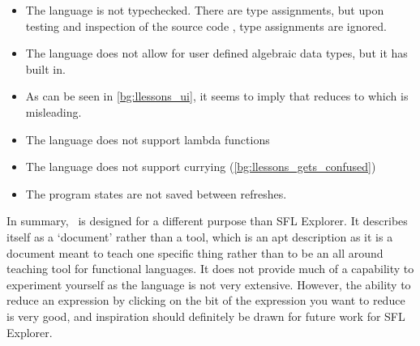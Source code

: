 \begin{itemize}
    \item The language is not typechecked. There are type assignments, but upon testing and inspection of the source code \cite{lambdalessonsgithub}, type assignments are ignored. 
    \item The language does not allow for user defined algebraic data types, but it has  built in. 
    \item As can be seen in \ref{bg:llessons_ui}, it seems to imply that  reduces to \sflinline{[x, y]} which is misleading. 
    \item The language does not support lambda functions
    \item The language does not support currying (\ref{bg:llessons_gets_confused})
    \item The program states are not saved between refreshes.
\end{itemize} 

In summary, \llessons\ is designed for a different purpose than SFL Explorer. It describes itself as a `document' \cite{lambdalessons} rather than a tool, which is an apt description as it is a document meant to teach one specific thing rather than to be an all around teaching tool for functional languages. It does not provide much of a capability to experiment yourself as the language is not very extensive. However, the ability to reduce an expression by clicking on the bit of the expression you want to reduce is very good, and inspiration should definitely be drawn for future work for SFL Explorer.  


